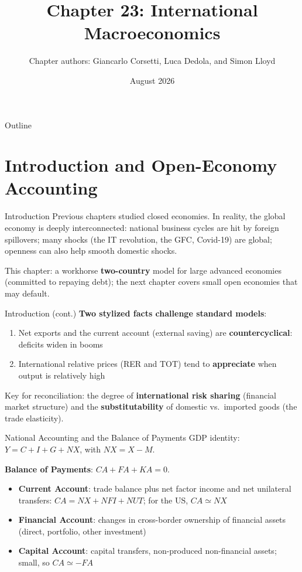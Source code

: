 \documentclass[blue]{beamer}
\title[Chapter23]{Chapter 23: International Macroeconomics}
\author[Giancarlo Corsetti, Luca Dedola, and Simon Lloyd]{Chapter authors: Giancarlo Corsetti, Luca Dedola, and Simon Lloyd}
\date[August 2026]{August 2026}
\begin{document}
\begin{frame}
\titlepage
\end{frame}

\begin{frame}{Outline}
\tableofcontents
\end{frame}

\section{Introduction and Open-Economy Accounting}

\begin{frame}{Introduction}
Previous chapters studied closed economies. In reality, the global economy is deeply interconnected: national business cycles are hit by foreign spillovers; many shocks (the IT revolution, the GFC, Covid-19) are global; openness can also help smooth domestic shocks.

\bigskip
This chapter: a workhorse \textbf{two-country} model for large advanced economies (committed to repaying debt); the next chapter covers small open economies that may default.

\end{frame}

\begin{frame}{Introduction (cont.)}
\bigskip
\textbf{Two stylized facts challenge standard models}:
\begin{enumerate}
    \item Net exports and the current account (external saving) are \textbf{countercyclical}: deficits widen in booms
    \item International relative prices (RER and TOT) tend to \textbf{appreciate} when output is relatively high
\end{enumerate}

\bigskip
Key for reconciliation: the degree of \textbf{international risk sharing} (financial market structure) and the \textbf{substitutability} of domestic vs.\ imported goods (the trade elasticity).
\end{frame}

\begin{frame}{National Accounting and the Balance of Payments}
GDP identity: $Y = C + I + G + NX$, with $NX = X - M$.

\bigskip
\textbf{Balance of Payments}: $CA + FA + KA = 0$.
\begin{itemize}
    \item \textbf{Current Account}: trade balance plus net factor income and net unilateral transfers: $CA = NX + NFI + NUT$; for the US, $CA \simeq NX$
    \item \textbf{Financial Account}: changes in cross-border ownership of financial assets (direct, portfolio, other investment)
    \item \textbf{Capital Account}: capital transfers, non-produced non-financial assets; small, so $CA \simeq -FA$
\end{itemize}

\end{frame}
\end{document}
